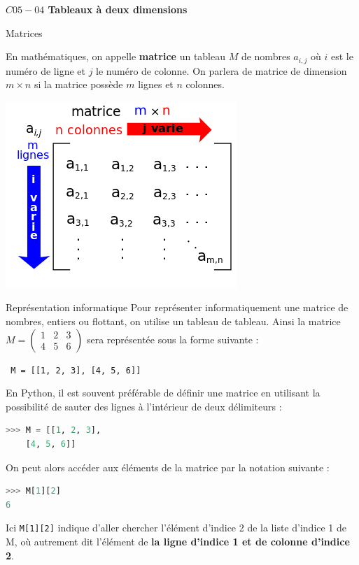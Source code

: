 \documentclass[a4paper,11pt]{article}
\begin{document}
\sffamily %
\begin{center}
 \large{\textbf{$C05-04$ Tableaux à deux dimensions}}
\end{center}


\begin{definition}{Matrices}
\parbox{0.65\linewidth}{
 \noindent En mathématiques, on appelle \textbf{matrice} un tableau $M$ de nombres $a_{i,j}$ où $i$ est le numéro de ligne et $j$ le numéro de colonne. On parlera de matrice de dimension $m\times n$ si la matrice possède $m$ lignes et $n$ colonnes.\\
 }\hfill\parbox{0.3\linewidth}{
 \begin{center}
 \includegraphics[width=0.9\linewidth]{Matrice.png}
 \end{center}
 }
\end{definition}
\begin{info}{Représentation informatique}
 Pour représenter informatiquement une matrice de nombres, entiers ou flottant, on utilise un tableau de tableau. Ainsi la matrice $M = \begin{pmatrix}
1&2&3\\
4&5&6                                                                                                                                        \end{pmatrix}$ sera représentée sous la forme suivante :
 \begin{center}
  \texttt{ M = [[1, 2, 3], [4, 5, 6]]}
 \end{center}
En Python, il est souvent préférable de définir une matrice en utilisant la possibilité de sauter des lignes à l'intérieur de deux délimiteurs :
\begin{lstlisting}[language=python, caption = {Matrice}]
>>> M = [[1, 2, 3],
	[4, 5, 6]]		
\end{lstlisting}

On peut alors accéder aux éléments de la matrice par la notation suivante :
\begin{lstlisting}[language=python, caption = {Eléments}]
>>> M[1][2]
6
\end{lstlisting}
Ici \texttt{M[1][2]} indique d'aller chercher l'élément  d'indice 2 de la liste d'indice 1 de M, où autrement dit l'élément de \textbf{la ligne d'indice 1 et de colonne d'indice 2}.
\end{info}
\end{document}

